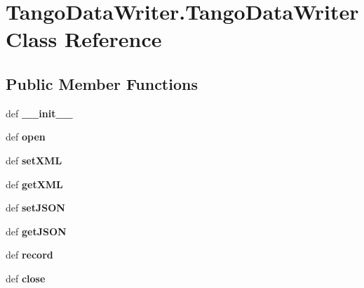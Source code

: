 \hypertarget{classTangoDataWriter_1_1TangoDataWriter}{
\section{TangoDataWriter.TangoDataWriter Class Reference}
\label{classTangoDataWriter_1_1TangoDataWriter}
}
\subsection*{Public Member Functions}
\begin{DoxyCompactItemize}
\item 
\hypertarget{classTangoDataWriter_1_1TangoDataWriter_a2b6f5618c7b7b03046f5a78aa5d388ac}{
def {\bfseries \_\-\_\-init\_\-\_\-}}
\label{classTangoDataWriter_1_1TangoDataWriter_a2b6f5618c7b7b03046f5a78aa5d388ac}

\item 
\hypertarget{classTangoDataWriter_1_1TangoDataWriter_a52aa501657e9c825df6b4bc81a26c3b2}{
def {\bfseries open}}
\label{classTangoDataWriter_1_1TangoDataWriter_a52aa501657e9c825df6b4bc81a26c3b2}

\item 
\hypertarget{classTangoDataWriter_1_1TangoDataWriter_a1c36bfaddabb215b8d2a6f37bdb22915}{
def {\bfseries setXML}}
\label{classTangoDataWriter_1_1TangoDataWriter_a1c36bfaddabb215b8d2a6f37bdb22915}

\item 
\hypertarget{classTangoDataWriter_1_1TangoDataWriter_ae0cf4858589695bea3e6606932905341}{
def {\bfseries getXML}}
\label{classTangoDataWriter_1_1TangoDataWriter_ae0cf4858589695bea3e6606932905341}

\item 
\hypertarget{classTangoDataWriter_1_1TangoDataWriter_ab80dc1a06e51f50a8e4583a6c1a4a050}{
def {\bfseries setJSON}}
\label{classTangoDataWriter_1_1TangoDataWriter_ab80dc1a06e51f50a8e4583a6c1a4a050}

\item 
\hypertarget{classTangoDataWriter_1_1TangoDataWriter_a73b35d9bb5a34efbfacd5c1ace7f9b7b}{
def {\bfseries getJSON}}
\label{classTangoDataWriter_1_1TangoDataWriter_a73b35d9bb5a34efbfacd5c1ace7f9b7b}

\item 
\hypertarget{classTangoDataWriter_1_1TangoDataWriter_a51dda53c00283da887973686881e9cc3}{
def {\bfseries record}}
\label{classTangoDataWriter_1_1TangoDataWriter_a51dda53c00283da887973686881e9cc3}

\item 
\hypertarget{classTangoDataWriter_1_1TangoDataWriter_abb58170cab245ac497e07a48e3a201cd}{
def {\bfseries close}}
\label{classTangoDataWriter_1_1TangoDataWriter_abb58170cab245ac497e07a48e3a201cd}

\end{DoxyCompactItemize}
